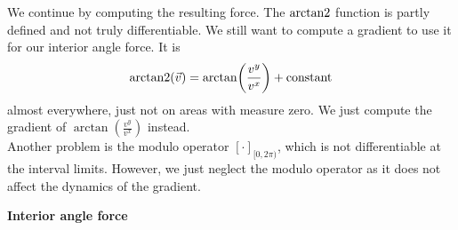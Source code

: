 We continue by computing the resulting force. 
The $\operatorname{arctan2}$ function is partly defined and not truly differentiable. 
We still want to compute a gradient to use it for our interior angle force. 
It is $$\operatorname{arctan2}(\vec{v}) = \arctan\!\left(\frac{v^{y}}{v^{x}} \right) + \text{constant}$$ almost everywhere, just not on areas with measure zero. 
We just compute the gradient of $\arctan(\frac{v^{y}}{v^{x}})$ instead. \\
Another problem is the modulo operator $[ \cdot ]_{[0,2\pi)}$, which is not differentiable at the interval limits.
However, we just neglect the modulo operator as it does not affect the dynamics of the gradient.

\begin{proposition} \textbf{Interior angle force} \\



\end{proposition}
